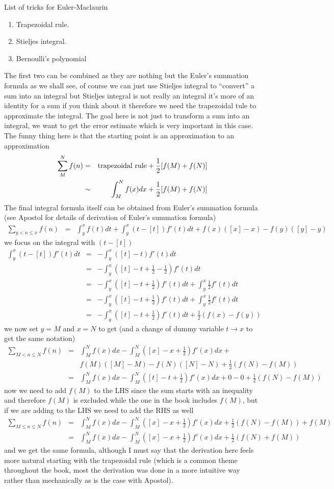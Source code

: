 \documentclass[aps,preprint,preprintnumbers,nofootinbib,showpacs,prd]{revtex4-1}
\newcommand{\nbea}{\begin{eqnarray*}}
\newcommand{\neea}{\end{eqnarray*}}
\begin{document}
List of tricks for Euler-Maclaurin
%
\begin{enumerate}
\item Trapezoidal rule.
%
\item Stieljes integral.
%
\item Bernoulli's polynomial
\end{enumerate}
%
The first two can be combined as they are nothing but the Euler's summation formula as we shall see, of course we can just use Stieljes integral to ``convert'' a sum into an integral but Stieljes integral is not really an integral it's more of an identity for a sum if you think about it therefore we need the trapezoidal tule to approximate the integral. The goal here is not just to transform a sum into an integral, we want to get the error estimate which is very important in this case. The funny thing here is that the starting point is an approximation to an approximation
%
\nbea
\sum_{M}^N f(n) & = & {\rm trapezoidal~rule} + \frac{1}{2}[f(M) + f(N)] \\
& \sim & \int_M^N f(x) dx + \frac{1}{2}[f(M) + f(N)]
\neea
%
The final integral formula itself can be obtained from Euler's summation formula (see Apostol for details of derivation of Euler's summation formula)
%
\nbea
\sum_{y < n \le x} f(n) & = & \int_y^x f(t) dt + \int_y^x (t - [t]) f'(t) dt + f(x)([x] - x) - f(y)([y] - y)
\neea
%
we focus on the integral with $(t-[t])$
%
\nbea
\int_y^x (t - [t]) f'(t) dt & = & -\int_y^x ([t] - t) f'(t) dt \\
& = & -\int_y^x ([t] - t + \frac{1}{2} - \frac{1}{2}) f'(t) dt \\
& = & -\int_y^x ([t] - t + \frac{1}{2}) f'(t) dt  + \int_y^x \frac{1}{2} f'(t) dt \\
& = & -\int_y^x ([t] - t + \frac{1}{2}) f'(t) dt  + \int_y^x \frac{1}{2} f'(t) dt \\
& = & -\int_y^x ([t] - t + \frac{1}{2}) f'(t) dt  + \frac{1}{2} (f(x) - f(y))
\neea
%
we now set $y = M$ and $x = N$ to get (and a change of dummy variable $t \to x$ to get the same notation)
%
\nbea
\sum_{M < n \le N} f(n) & = & \int_M^N f(x) dx - \int_M^N ([x] - x + \frac{1}{2}) f'(x) dx + \\
&& f(M)([M] - M) - f(N)([N] - N) + \frac{1}{2} (f(N) - f(M)) \\
& = & \int_M^N f(x) dx - \int_M^N ([t] - t + \frac{1}{2}) f'(x) dx  + 0 - 0 + \frac{1}{2} (f(N) - f(M))
\neea
%
now we need to add $f(M)$ to the LHS since the sum starts with an inequality and therefore $f(M)$ is excluded while the one in the book includes $f(M)$, but if we are adding to the LHS we need to add the RHS as well
%
\nbea
\sum_{M \le n \le N} f(n) & = & \int_M^N f(x) dx - \int_M^N ([x] - x + \frac{1}{2}) f'(x) dx  + \frac{1}{2} (f(N) - f(M)) + f(M) \\
& = & \int_M^N f(x) dx - \int_M^N ([x] - x + \frac{1}{2}) f'(x) dx + \frac{1}{2} (f(N) + f(M))
\neea
%
and we get the same formula, although I must say that the derivation here feels more natural starting with the trapezoidal rule (which is a common theme throughout the book, most the derivation was done in a more intuitive way rather than mechanically as is the case with Apostol).
\end{document}
